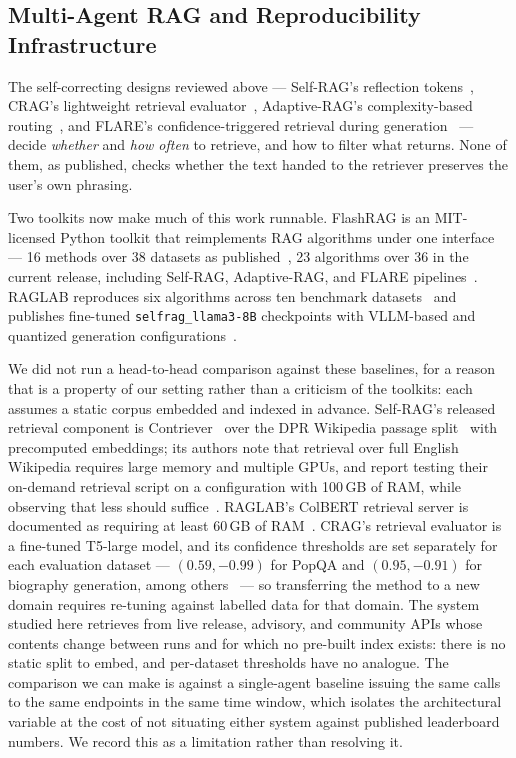 \subsection{Multi-Agent RAG and Reproducibility Infrastructure}

The self-correcting designs reviewed above --- Self-RAG's reflection
tokens~\cite{asai2024selfrag}, CRAG's lightweight retrieval
evaluator~\cite{yan2024crag}, Adaptive-RAG's complexity-based
routing~\cite{jeong2024adaptiverag}, and FLARE's confidence-triggered retrieval
during generation~\cite{jiang2023flare} --- decide \emph{whether} and \emph{how
often} to retrieve, and how to filter what returns. None of them, as published,
checks whether the text handed to the retriever preserves the user's own
phrasing.

Two toolkits now make much of this work runnable. FlashRAG is an MIT-licensed
Python toolkit that reimplements RAG algorithms under one interface --- 16
methods over 38 datasets as published~\cite{jin2025flashrag}, 23 algorithms over
36 in the current release, including Self-RAG, Adaptive-RAG, and FLARE
pipelines~\cite{flashrag2025repo}. RAGLAB reproduces six algorithms across ten
benchmark datasets~\cite{zhang2024raglab} and publishes fine-tuned
\texttt{selfrag\_llama3-8B} checkpoints with VLLM-based and quantized generation
configurations~\cite{raglab2024repo}.

We did not run a head-to-head comparison against these baselines, for a reason
that is a property of our setting rather than a criticism of the toolkits: each
assumes a static corpus embedded and indexed in advance. Self-RAG's released
retrieval component is Contriever~\cite{izacard2022contriever} over the DPR
Wikipedia passage split~\cite{karpukhin2020dpr} with precomputed embeddings; its
authors note that retrieval over full English Wikipedia requires large memory
and multiple GPUs, and report testing their on-demand retrieval script on a
configuration with 100\,GB of RAM, while observing that less should
suffice~\cite{selfrag2023repo}. RAGLAB's ColBERT retrieval server is documented
as requiring at least 60\,GB of RAM~\cite{raglab2024repo}. CRAG's retrieval
evaluator is a fine-tuned T5-large model, and its confidence thresholds are set
separately for each evaluation dataset --- $(0.59, -0.99)$ for PopQA and
$(0.95, -0.91)$ for biography generation, among others~\cite{yan2024crag} --- so
transferring the method to a new domain requires re-tuning against labelled data
for that domain. The system studied here retrieves from live release, advisory,
and community APIs whose contents change between runs and for which no pre-built
index exists: there is no static split to embed, and per-dataset thresholds have
no analogue. The comparison we can make is against a single-agent baseline
issuing the same calls to the same endpoints in the same time window, which
isolates the architectural variable at the cost of not situating either system
against published leaderboard numbers. We record this as a limitation rather than
resolving it.


